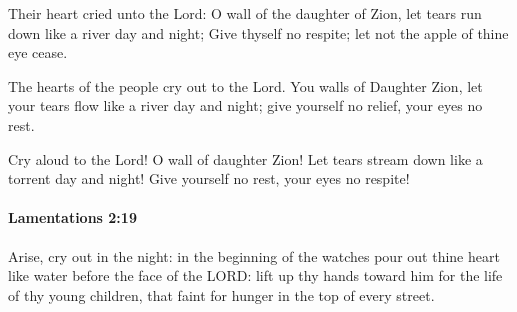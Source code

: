 			\begin{versebox}
					\item[BHS] 
					\item[LXX] 
					\item[ASV] Their heart cried unto the Lord: O wall of the daughter of Zion, let tears run down like a river day and night; Give thyself no respite; let not the apple of thine eye cease.
					\item[NIV] The hearts of the people cry out to the Lord. You walls of Daughter Zion, let your tears flow like a river day and night; give yourself no relief, your eyes no rest.
					\item[NRSV] Cry aloud to the Lord! O wall of daughter Zion! Let tears stream down like a torrent day and night! Give yourself no rest, your eyes no respite!
			\end{versebox}

		\paragraph{Lamentations 2:19} %
			\label{LAMENTATIONS-2-19}

			Arise, cry out in the night: in the beginning of the watches pour out thine heart like water before the face of the LORD: lift up thy hands toward him for the life of thy young children, that faint for hunger in the top of every street.

